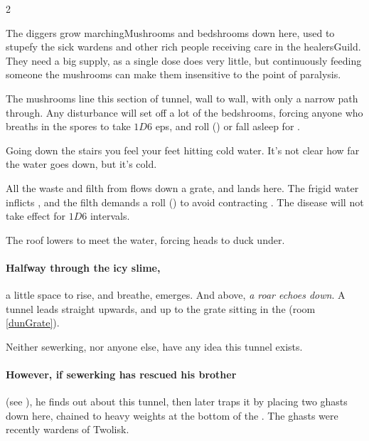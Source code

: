 \begin{multicols}{2}

The \gls{diggers} grow \glspl{marchingMushroom} and \glspl{bedshroom} down here, used to stupefy the sick \glspl{warden} and other rich people receiving care in the \gls{healersGuild}.
They need a big supply, as a single dose does very little, but continuously feeding someone the mushrooms can make them insensitive to the point of paralysis.

The mushrooms line this section of tunnel, wall to wall, with only a narrow path through.
Any disturbance will set off a lot of the \glspl{bedshroom}, forcing anyone who breaths in the spores to take $1D6$ \glspl{ep}, and roll  (\tn[12]) or fall asleep for .


\begin{boxtext}
  Going down the stairs you feel your feet hitting cold water.
  It's not clear how far the water goes down, but it's cold.
\end{boxtext}

All the waste and filth from  flows down a grate, and lands here.
The frigid water inflicts , and the filth demands a  roll (\tn[10]) to avoid contracting
\iftoggle{judgement}{Corpse Hands (see the book \textit{Judgement}, \autopageref{Corpse Hands})}{a disease which slowly paralyses them}.
The disease will not take effect for $1D6$ \glspl{interval}.

The roof lowers to meet the water, forcing heads to duck under.

\paragraph{Halfway through the icy slime,}
a little space to rise, and breathe, emerges.
And above, \emph{a roar echoes down}.
A tunnel leads straight upwards, and up to the grate sitting in the  (room \vref{dunGrate}).

Neither \gls{sewerking}, nor anyone else, have any idea this tunnel exists.

\paragraph{However, if \gls{sewerking} has rescued his brother}
(see ), he finds out about this tunnel, then later traps it by placing two ghasts down here, chained to heavy weights at the bottom of the .
The ghasts were recently \glspl{warden} of Twolisk.


\end{multicols}
